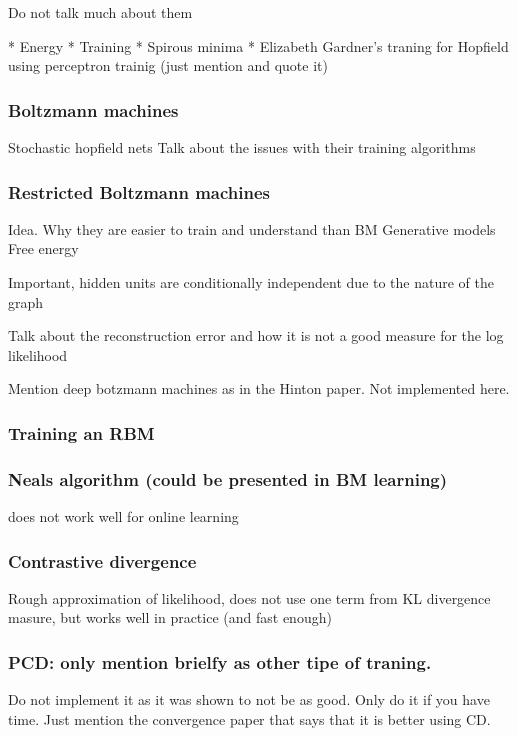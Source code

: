 \documentclass[11pt, fleqn, twoside]{article}
\begin{document}
  Do not talk much about them

  * Energy
  * Training
  * Spirous minima
  * Elizabeth Gardner's traning for Hopfield using perceptron trainig (just mention and quote it)


\subsubsection{Boltzmann machines}
  Stochastic hopfield nets
  Talk about the issues with their training algorithms


\subsubsection {Restricted Boltzmann machines}
  Idea.
  Why they are easier to train and understand than BM
  Generative models
  Free energy

  Important, hidden units are conditionally independent due to the nature of the graph

  Talk about the reconstruction error and how it is not a good measure for the log likelihood

  Mention deep botzmann machines as in the Hinton paper. Not implemented here.

\subsubsection {Training an RBM}

\subsubsection {Neals algorithm (could be presented in BM learning)}
    does not work well for online learning

\subsubsection{ Contrastive divergence}
  Rough approximation of likelihood, does not use one term from KL divergence masure,
  but works well in practice (and fast enough)


\subsubsection{ PCD: only mention brielfy as other tipe of traning.}
  Do not implement it as it was shown to not be as good.
  Only do it if you have time.
  Just mention the convergence paper that says that it is better using CD.
\end{document}
